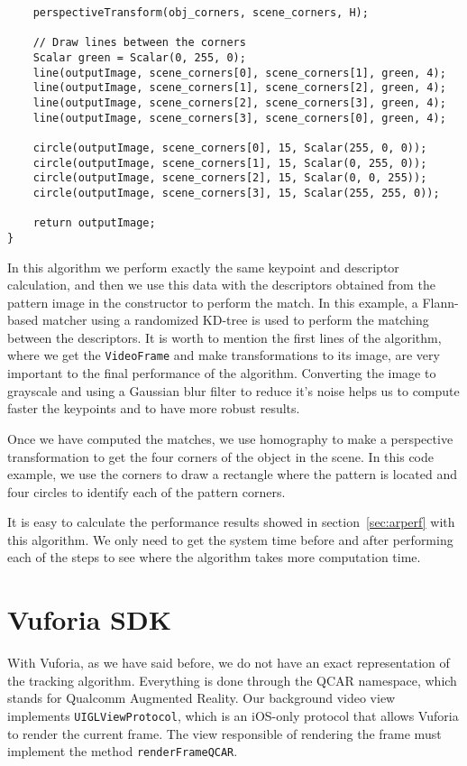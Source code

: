 \begin{verbatim}
    perspectiveTransform(obj_corners, scene_corners, H);

    // Draw lines between the corners
    Scalar green = Scalar(0, 255, 0);
    line(outputImage, scene_corners[0], scene_corners[1], green, 4);
    line(outputImage, scene_corners[1], scene_corners[2], green, 4);
    line(outputImage, scene_corners[2], scene_corners[3], green, 4);
    line(outputImage, scene_corners[3], scene_corners[0], green, 4);    

    circle(outputImage, scene_corners[0], 15, Scalar(255, 0, 0));
    circle(outputImage, scene_corners[1], 15, Scalar(0, 255, 0));
    circle(outputImage, scene_corners[2], 15, Scalar(0, 0, 255));
    circle(outputImage, scene_corners[3], 15, Scalar(255, 255, 0));
    
    return outputImage;
}
\end{verbatim}

In this algorithm we perform exactly the same keypoint and descriptor
calculation, and then we use this data with the descriptors obtained from the
pattern image in the constructor to perform the match. In this example, a
Flann-based matcher using a randomized KD-tree is used to perform the matching
between the descriptors. It is worth to mention the first lines of the
algorithm, where we get the \texttt{VideoFrame} and make transformations to its
image, are very important to the final performance of the algorithm. Converting
the image to grayscale and using a Gaussian blur filter to reduce it's noise
helps us to compute faster the keypoints and to have more robust results.

Once we have computed the matches, we use homography to make a perspective
transformation to get the four corners of the object in the scene. In this code
example, we use the corners to draw a rectangle where the pattern is located
and four circles to identify each of the pattern corners.

It is easy to calculate the performance results showed in
section~\ref{sec:arperf} with this algorithm. We only need to get the
system time before and after performing each of the steps to see where the
algorithm takes more computation time. 

\section{Vuforia SDK}
With Vuforia, as we have said before, we do not have an exact representation of
the tracking algorithm. Everything is done through the QCAR namespace, which stands
for Qualcomm Augmented Reality. Our background video view implements
\texttt{UIGL\-View\-Protocol}, which is an iOS-only protocol that allows
Vuforia to render the current frame. The view responsible of rendering the
frame must implement the method \texttt{renderFrameQCAR}. 

